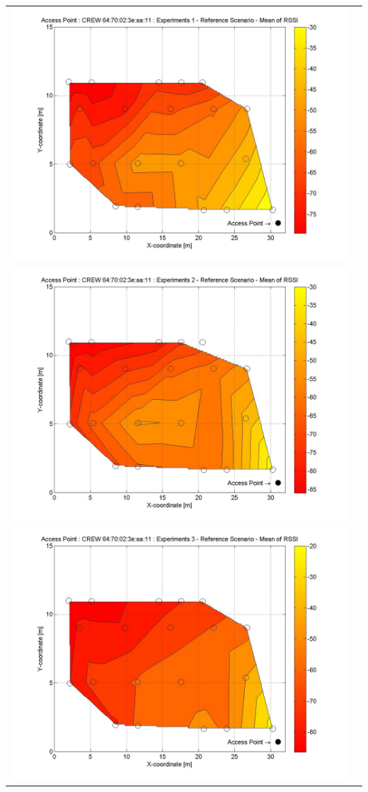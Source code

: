 \documentclass[11pt,a4paper,headinclude,footinclude,chapterprefix=on]{scrreprt}
\begin{document}
\begin{longtable}
	{lr} 
	\includegraphics[width=13cm]{../../Source/plot/CREW_11/11_Ref_Ex_1_Mean.jpg} \\
	\includegraphics[width=13cm]{../../Source/plot/CREW_11/11_Ref_Ex_2_Mean.jpg} \\
	\includegraphics[width=13cm]{../../Source/plot/CREW_11/11_Ref_Ex_3_Mean.jpg} \\

\end{longtable}
\end{document}
